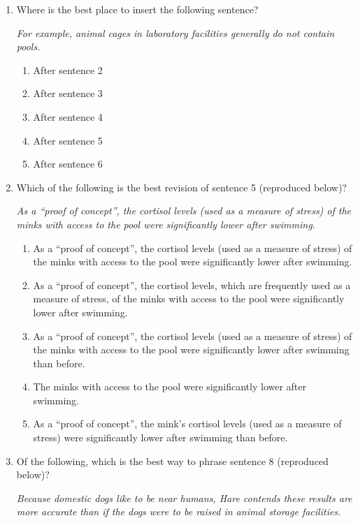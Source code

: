 \begin{enumerate}
\item Where is the best place to insert the following sentence?

\textit{For example, animal cages in laboratory facilities generally do not contain pools.}

\begin{enumerate}[label=(\Alph*)]
\item After sentence 2
\item After sentence 3
\item After sentence 4
\item After sentence 5
\item After sentence 6
\end{enumerate}

\item{Which of the following is the best revision of sentence 5 (reproduced below)?}

\textit{As a ``proof of concept'', the cortisol levels (used as a measure of stress) of the minks with access to the pool were significantly lower after swimming.}

\begin{enumerate}[label=(\Alph*)]
\item As a ``proof of concept'', the cortisol levels (used as a measure of stress) of the minks with access to the pool were significantly lower after swimming.
\item As a ``proof of concept'', the cortisol levels, which are frequently used as a measure of stress, of the minks with access to the pool were significantly lower after swimming.
\item As a ``proof of concept'', the cortisol levels (used as a measure of stress) of the minks with access to the pool were significantly lower after swimming than before.
\item The minks with access to the pool were significantly lower after swimming. 
\item As a ``proof of concept'', the mink's cortisol levels (used as a measure of stress) were significantly lower after swimming than before. 
\end{enumerate}

\item Of the following, which is the best way to phrase sentence 8 (reproduced below)?

\textit{Because domestic dogs like to be near humans, Hare contends these results are more accurate than if the dogs were to be raised in animal storage facilities.}


\end{enumerate}

